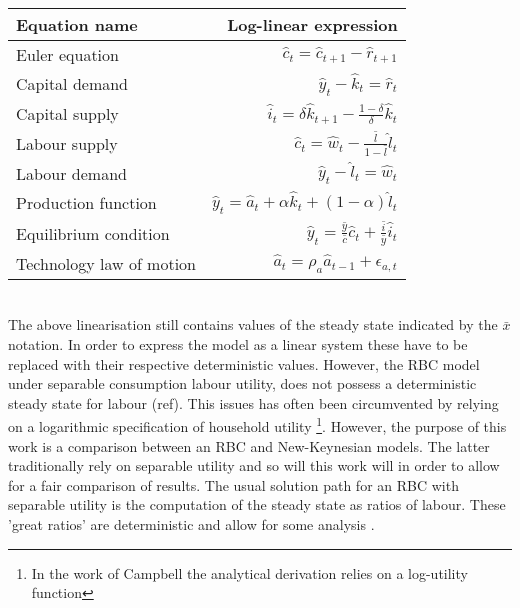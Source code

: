 \documentclass[12pt,a4paper,english]{article} %
\begin{document}
	\begin{tabular}{lr}
		\textbf{Equation name} & \textbf{Log-linear expression}\\
		\hline
		Euler equation & $\hat{c}_t = \hat{c}_{t+1} - \hat{r}_{t+1}$ \\ %
		Capital demand & $\hat{y}_t - \hat{k}_t = \hat{r}_t$ \\
		Capital supply &  $\hat{i}_t = \delta \hat{k}_{t+1} - \frac{1-\delta}{\delta} \hat{k}_t$ \\
		Labour supply & $\hat{c}_t = \hat{w}_t - \frac{\bar{l}}{1-\bar{l}} \hat{l}_t$ \\
		Labour demand & $\hat{y}_t - \hat{l}_t = \hat{w}_t$ \\
		Production function & $\hat{y}_t = \hat{a}_t + \alpha \hat{k}_t + (1-\alpha) \hat{l}_t$ \\
		Equilibrium condition & $\hat{y}_t = \frac{\bar{y}}{\bar{c}} \hat{c}_t + \frac{\bar{i}}{\bar{y}} \hat{i}_t$ \\
		Technology law of motion & $\hat{a}_t = \rho_a \hat{a}_{t-1} + \epsilon_{a,t}$ \\
	\end{tabular}\\
	
	The above linearisation still contains values of the steady state indicated by the $\bar{x}$ notation. In order to express the model as a linear system these have to be replaced with their respective deterministic values. However, the RBC model under separable consumption labour utility, does not possess a deterministic steady state for labour (ref). This issues has often been circumvented by relying on a logarithmic specification of household utility \cite{campbell_inspecting_1994} \footnote{In the work of Campbell the analytical derivation relies on a log-utility function}. However, the purpose of this work is a comparison between an RBC and New-Keynesian models. The latter traditionally rely on separable utility and so will this work will in order to allow for a fair comparison of results.
	The usual solution path for an RBC with separable utility is the computation of the steady state as ratios of labour. These 'great ratios' are deterministic and allow for some analysis \cite{prescott_theory_1986}.\\
	
\end{document}
